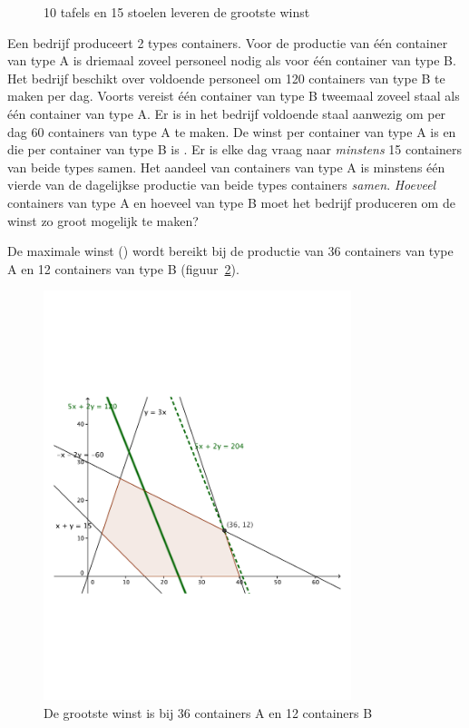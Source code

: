 \begin{oef}
\begin{opl}
\begin{figure}[hbtp]
\caption{10 tafels en 15 stoelen leveren de grootste winst}
\label{fig:tafelstoelen}
\end{figure}
\clearpage
        \end{opl}
\end{oef}

     
\begin{oef}
Een bedrijf produceert 2 types containers.
Voor de productie van 
\'{e}\'{e}n container van type A is driemaal zoveel personeel 
nodig als voor \'{e}\'{e}n container van type B. Het bedrijf 
beschikt over voldoende personeel om 120 containers van type B te 
maken per dag. Voorts vereist \'{e}\'{e}n container van type B 
tweemaal zoveel staal als \'{e}\'{e}n container van type A. Er is 
in het bedrijf voldoende staal aanwezig om per dag 60 containers 
van type A te maken. De winst per container van type A is  
en die per container van type B is . Er is elke dag 
vraag naar \emph{minstens} 15 containers van beide types samen. Het 
aandeel van containers van type A is minstens \'{e}\'{e}n  vierde 
van de dagelijkse productie van beide types containers \emph{samen}. 
\emph{Hoeveel} containers van type A en hoeveel van type B moet 
het bedrijf produceren om de winst zo groot mogelijk te maken?
\begin{opl}
De maximale winst () wordt bereikt bij de productie van 36 containers van type A en 12 containers van type B (figuur~\ref{fig:containersAB}).
\begin{figure}[hbtp]
\centering
\includegraphics[width=0.8\textwidth]{oefeningen/FigurenLP/OefcontainersAB.pdf}
\caption{De grootste winst is bij 36 containers A en 12 containers B}
\label{fig:containersAB}
\end{figure}
    \end{opl}
\end{oef}

